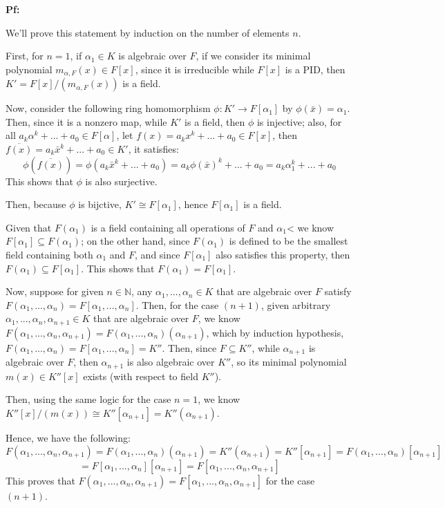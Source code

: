 \documentclass{article}
\begin{document}
\textbf{Pf:}

We'll prove this statement by induction on the number of elements $n$.

\hfil

First, for $n=1$, if $\alpha_1\in K$ is algebraic over $F$, if we consider its minimal polynomial $m_{\alpha,F}(x)\in F[x]$, since it is irreducible while $F[x]$ is a PID,
then $K'=F[x]/(m_{\alpha,F}(x))$ is a field. 

Now, consider the following ring homomorphism $\phi:K'\rightarrow F[\alpha_1]$ by $\phi(\bar{x})=\alpha_1$. Then, since it is a nonzero map, while $K'$ is a field, then $\phi$ is injective;
also, for all $a_k\alpha^k+...+a_0\in F[\alpha]$, let $f(x)=a_kx^k+...+a_0\in F[x]$, then $\overline{f(x)}=a_k\bar{x}^k+...+a_0\in K'$, it satisfies: 
$$\phi(\overline{f(x)})=\phi(a_k\bar{x}^k+...+a_0)=a_k\phi(\bar{x})^k+...+a_0=a_k\alpha_1^k+...+a_0$$
This shows that $\phi$ is also surjective.

Then, because $\phi$ is bijctive, $K'\cong F[\alpha_1]$, hence $F[\alpha_1]$ is a field.

Given that $F(\alpha_1)$ is a field containing all operations of $F$ and $\alpha_1$< we know $F[\alpha_1]\subseteq F(\alpha_1)$; on the other hand, since $F(\alpha_1)$ is defined to be the smallest field containing both $\alpha_1$ and $F$,
and since $F[\alpha_1]$ also satisfies this property, then $F(\alpha_1)\subseteq F[\alpha_1]$. This shows that $F(\alpha_1)=F[\alpha_1]$.

\hfil

Now, suppose for given $n\in\mathbb{N}$, any $\alpha_1,...,\alpha_n\in K$ that are algebraic over $F$ satisfy $F(\alpha_1,...,\alpha_n)=F[\alpha_1,...,\alpha_n]$.
Then, for the case $(n+1)$, given arbitrary $\alpha_1,...,\alpha_n,\alpha_{n+1}\in K$ that are algebraic over $F$, we know $F(\alpha_1,...,\alpha_n,\alpha_{n+1})=F(\alpha_1,...,\alpha_n)(\alpha_{n+1})$,
which by induction hypothesis, $F(\alpha_1,...,\alpha_n)=F[\alpha_1,...,\alpha_n]=K''$. Then, since $F\subseteq K''$, while $\alpha_{n+1}$ is algebraic over $F$, then $\alpha_{n+1}$ is also algebraic over $K''$, so its minimal polynomial $m(x)\in K''[x]$ exists (with respect to field $K''$).

Then, using the same logic for the case $n=1$, we know $K''[x]/(m(x))\cong K''[\alpha_{n+1}]=K''(\alpha_{n+1})$.

Hence, we have the following:
$$F(\alpha_1,...,\alpha_n,\alpha_{n+1})=F(\alpha_1,...,\alpha_n)(\alpha_{n+1})=K''(\alpha_{n+1})=K''[\alpha_{n+1}] = F(\alpha_1,...,\alpha_n)[\alpha_{n+1}]$$
$$= F[\alpha_1,...,\alpha_n][\alpha_{n+1}]=F[\alpha_1,...,\alpha_n,\alpha_{n+1}]$$
This proves that $F(\alpha_1,...,\alpha_n,\alpha_{n+1})=F[\alpha_1,...,\alpha_n,\alpha_{n+1}]$ for the case $(n+1)$.
\end{document}
